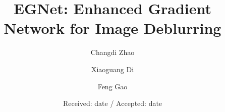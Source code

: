 %
%
%
%
%

\begin{sloppypar}
\title{EGNet: Enhanced Gradient Network for Image Deblurring%
}


\author{Changdi Zhao         \and
        Xiaoguang Di         \and
        Feng Gao
}



\date{Received: date / Accepted: date}


\maketitle


\end{sloppypar}

